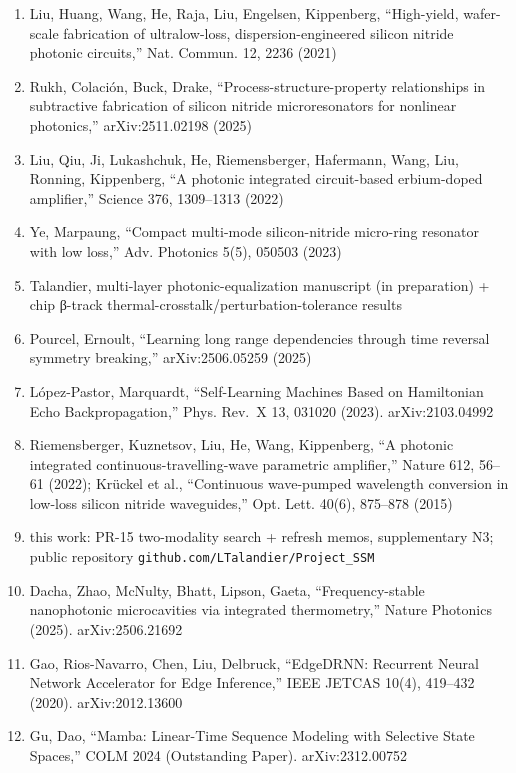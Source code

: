 \documentclass[
  10pt,
]{article}
\begin{document}
\begin{enumerate}
\item
  Liu, Huang, Wang, He, Raja, Liu, Engelsen, Kippenberg, ``High-yield,
  wafer-scale fabrication of ultralow-loss, dispersion-engineered
  silicon nitride photonic circuits,'' Nat. Commun. 12, 2236 (2021)
\item
  Rukh, Colación, Buck, Drake, ``Process-structure-property
  relationships in subtractive fabrication of silicon nitride
  microresonators for nonlinear photonics,'' arXiv:2511.02198 (2025)
\item
  Liu, Qiu, Ji, Lukashchuk, He, Riemensberger, Hafermann, Wang, Liu,
  Ronning, Kippenberg, ``A photonic integrated circuit-based
  erbium-doped amplifier,'' Science 376, 1309--1313 (2022)
\item
  Ye, Marpaung, ``Compact multi-mode silicon-nitride micro-ring
  resonator with low loss,'' Adv. Photonics 5(5), 050503 (2023)
\item
  Talandier, multi-layer photonic-equalization manuscript (in
  preparation) + chip β-track thermal-crosstalk/perturbation-tolerance
  results
\item
  Pourcel, Ernoult, ``Learning long range dependencies through time
  reversal symmetry breaking,'' arXiv:2506.05259 (2025)
\item
  López-Pastor, Marquardt, ``Self-Learning Machines Based on Hamiltonian
  Echo Backpropagation,'' Phys. Rev.~X 13, 031020 (2023).
  arXiv:2103.04992
\item
  Riemensberger, Kuznetsov, Liu, He, Wang, Kippenberg, ``A photonic
  integrated continuous-travelling-wave parametric amplifier,'' Nature
  612, 56--61 (2022); Krückel et al., ``Continuous wave-pumped
  wavelength conversion in low-loss silicon nitride waveguides,'' Opt.
  Lett. 40(6), 875--878 (2015)
\item
  this work: PR-15 two-modality search + refresh memos, supplementary
  N3; public repository \texttt{github.com/LTalandier/Project\_SSM}
\item
  Dacha, Zhao, McNulty, Bhatt, Lipson, Gaeta, ``Frequency-stable
  nanophotonic microcavities via integrated thermometry,'' Nature
  Photonics (2025). arXiv:2506.21692
\item
  Gao, Rios-Navarro, Chen, Liu, Delbruck, ``EdgeDRNN: Recurrent Neural
  Network Accelerator for Edge Inference,'' IEEE JETCAS 10(4), 419--432
  (2020). arXiv:2012.13600
\item
  Gu, Dao, ``Mamba: Linear-Time Sequence Modeling with Selective State
  Spaces,'' COLM 2024 (Outstanding Paper). arXiv:2312.00752
\end{enumerate}
\end{document}
